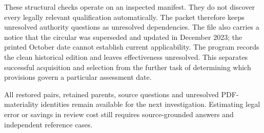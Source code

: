 These structural checks operate on an inspected manifest. They do not discover
every legally relevant qualification automatically. The packet therefore keeps
unresolved authority questions as unresolved dependencies. The file also carries
a notice that the circular was superseded and updated in December 2023; the
printed October date cannot establish current applicability. The program
records the clean historical edition and leaves effectiveness unresolved. This
separates successful acquisition and selection from the further task of
determining which provisions govern a particular assessment date.

All restored pairs, retained parents, source questions and unresolved
PDF-materiality identities remain available for the next investigation.
Estimating legal error or savings in review cost still requires source-grounded
answers and independent reference cases.
